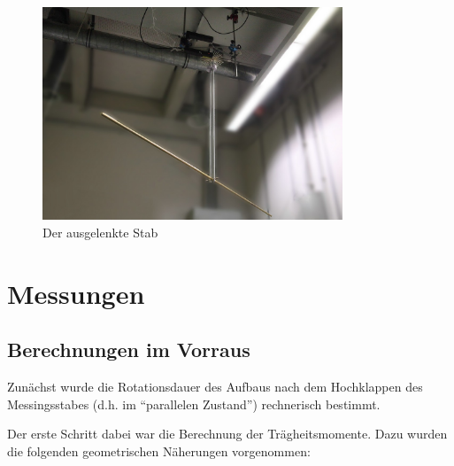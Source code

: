 \documentclass[11pt]{scrartcl}
\begin{document}

\begin{figure}[ht]
\begin{center}
\includegraphics[width=0.8\textwidth]{stab-fertig.jpg}
\end{center}
\vspace{-1.5\baselineskip}
\caption{Der ausgelenkte Stab}
\label{stab-fertig}
\end{figure}

\section{Messungen}
\subsection{Berechnungen im Vorraus} %

Zun\"achst wurde die Rotationsdauer des Aufbaus nach dem Hochklappen des Messingsstabes (d.h. im "`parallelen Zustand"') rechnerisch bestimmt. 

Der erste Schritt dabei war die Berechnung der Tr\"agheitsmomente. Dazu wurden die folgenden geometrischen N\"aherungen vorgenommen:
\end{document}

